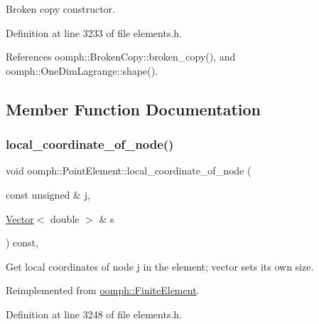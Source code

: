 Broken copy constructor. 



Definition at line 3233 of file elements.\+h.



References oomph\+::\+Broken\+Copy\+::broken\+\_\+copy(), and oomph\+::\+One\+Dim\+Lagrange\+::shape().



\subsection{Member Function Documentation}
\mbox{\label{classoomph_1_1PointElement_ac25e0eb9aa65e8b90ef4907942e2c87f}} 
\subsubsection{\texorpdfstring{local\+\_\+coordinate\+\_\+of\+\_\+node()}{local\_coordinate\_of\_node()}}
{\footnotesize\ttfamily void oomph\+::\+Point\+Element\+::local\+\_\+coordinate\+\_\+of\+\_\+node (\begin{DoxyParamCaption}\item[{const unsigned \&}]{j,  }\item[{\hyperlink{classoomph_1_1Vector}{Vector}$<$ double $>$ \&}]{s }\end{DoxyParamCaption}) const\hspace{0.3cm}{\ttfamily [inline]}, {\ttfamily [virtual]}}



Get local coordinates of node j in the element; vector sets its own size. 



Reimplemented from \hyperlink{classoomph_1_1FiniteElement_a22bc4ee35e4f948d8d7fba18c7b4f4c4}{oomph\+::\+Finite\+Element}.



Definition at line 3248 of file elements.\+h.

\mbox{\label{classoomph_1_1PointElement_a27f0b22c4f5aae72b0223748b5cb1185}} 
